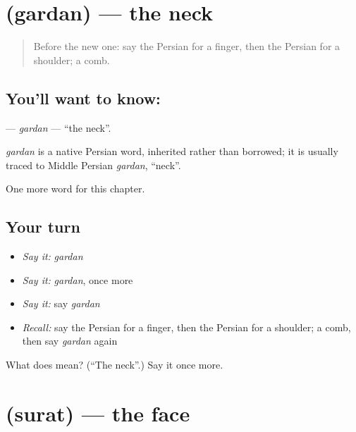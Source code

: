 \section[\texorpdfstring{\fa{گردن} (gardan)}{گردن (gardan)}]{ (gardan) — the neck}

\label{lesson:FA-C28-gardan}



\begin{quote}
Before the new one: say the Persian for a finger, then the Persian for a shoulder; a comb.
\end{quote}

\subsection*{You'll want to know: }
\textbf{} — \emph{gardan} — \textquotedblleft{}the neck\textquotedblright{}.

\begin{cousinweb}
\emph{gardan} is a native Persian word, inherited rather than borrowed; it is usually traced to Middle Persian \emph{gardan}, \textquotedblleft{}neck\textquotedblright{}.
\end{cousinweb}

\begin{grammarlens}[title={What you've built}]
One more word for this chapter.
\end{grammarlens}

\subsection*{Your turn}
\begin{itemize}
\raggedright
  \item \emph{Say it:} \emph{gardan}
  \item \emph{Say it:} \emph{gardan}, once more
  \item \emph{Say it:} say \emph{gardan}
  \item \emph{Recall:} say the Persian for a finger, then the Persian for a shoulder; a comb, then say \emph{gardan} again
\end{itemize}

\begin{tcolorbox}[breakable,colback=teal!4,colframe=teal!35!black,title={Before you move on}]
What does  mean? (\textquotedblleft{}The neck\textquotedblright{}.) Say it once more.
\end{tcolorbox}
\section[\texorpdfstring{\fa{صورت} (surat)}{صورت (surat)}]{ (surat) — the face}

